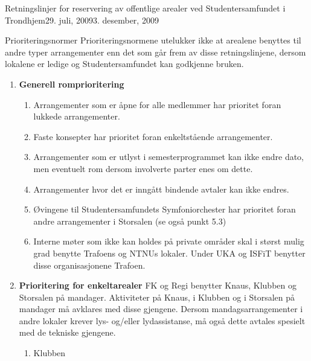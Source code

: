 \begin{instruks}{Retningslinjer for reservering av offentlige arealer
    ved Studentersamfundet i Trondhjem}{29. juli, 2009}{3. desember, 2009}
    \begin{instruksledd}{Prioriteringsnormer}
        Prioriteringsnormene utelukker ikke at arealene benyttes til andre typer
        arrangementer enn det som går frem av disse
        retningslinjene, dersom lokalene er ledige og Studentersamfundet kan godkjenne
        bruken.
        \begin{enumerate}
            \item \textbf{Generell romprioritering}
                \begin{enumerate}
                    \item Arrangementer som er åpne for alle medlemmer har prioritet
                        foran lukkede arrangementer.
                    \item Faste konsepter har prioritet foran enkeltstående
                        arrangementer.
                    \item Arrangementer som er utlyst i semesterprogrammet kan ikke
                        endre dato, men eventuelt rom dersom
                        involverte parter enes om dette.
                    \item Arrangementer hvor det er inngått bindende avtaler kan ikke
                        endres.
                    \item Øvingene til Studentersamfundets Symfoniorchester har
                        prioritet foran andre arrangementer i Storsalen (se
                        også punkt 5.3)
                    \item Interne møter som ikke kan holdes på private områder skal i
                        størst mulig grad benytte Trafoens og NTNUs
                        lokaler. Under UKA og ISFiT benytter disse organisasjonene
                        Trafoen.
                \end{enumerate}
            \item \textbf{ Prioritering for enkeltarealer}
                FK og Regi benytter Knaus, Klubben og Storsalen på mandager.
                Aktiviteter på Knaus, i Klubben og i Storsalen på
                mandager må avklares med disse gjengene. Dersom mandagsarrangementer i
                andre lokaler krever lys- og/eller
                lydassistanse, må også dette avtales spesielt med de tekniske
                gjengene.
                \begin{enumerate}
                    \item Klubben
                        \begin{enumerate}

\end{enumerate}
\end{enumerate}
\end{enumerate}
\end{instruksledd}
\end{instruks}
